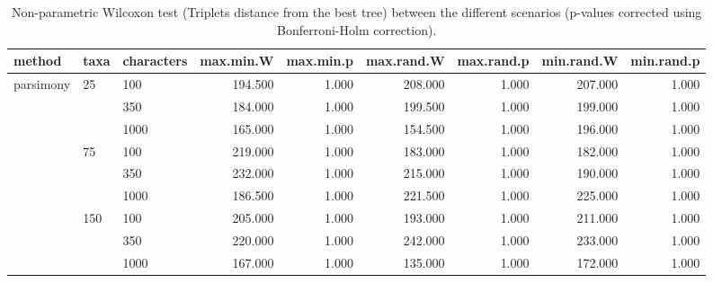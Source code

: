 \begin{table}[ht]
\centering
\begin{tabular}{lllrrrrrr}
  \hline
method & taxa & characters & max.min.W & max.min.p & max.rand.W & max.rand.p & min.rand.W & min.rand.p \\ 
  \hline
parsimony & 25 & 100 & 194.500 & 1.000 & 208.000 & 1.000 & 207.000 & 1.000 \\ 
   &  & 350 & 184.000 & 1.000 & 199.500 & 1.000 & 199.000 & 1.000 \\ 
   &  & 1000 & 165.000 & 1.000 & 154.500 & 1.000 & 196.000 & 1.000 \\ 
   & 75 & 100 & 219.000 & 1.000 & 183.000 & 1.000 & 182.000 & 1.000 \\ 
   &  & 350 & 232.000 & 1.000 & 215.000 & 1.000 & 190.000 & 1.000 \\ 
   &  & 1000 & 186.500 & 1.000 & 221.500 & 1.000 & 225.000 & 1.000 \\ 
   & 150 & 100 & 205.000 & 1.000 & 193.000 & 1.000 & 211.000 & 1.000 \\ 
   &  & 350 & 220.000 & 1.000 & 242.000 & 1.000 & 233.000 & 1.000 \\ 
   &  & 1000 & 167.000 & 1.000 & 135.000 & 1.000 & 172.000 & 1.000 \\ 
   \hline
\end{tabular}
\caption{Non-parametric Wilcoxon test (Triplets distance from the best tree) between the different scenarios (p-values corrected using Bonferroni-Holm correction).} 
\label{Full_Tab_Parsimony_WXTrbest}
\end{table}
